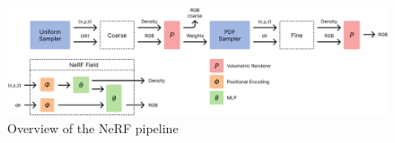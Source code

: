 \begin{figure}[h]
    \centering
    \includegraphics[width=1.0\textwidth]{figures/nerf-pipeline-overview.png}
    \caption{Overview of the NeRF pipeline}
    \label{fig:nerf-pipeline}
\end{figure}